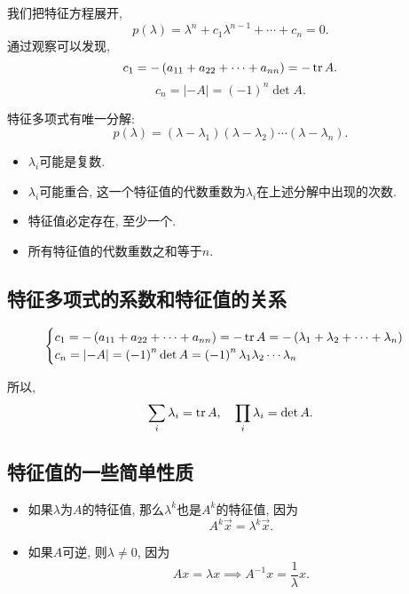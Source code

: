 我们把特征方程展开, 
\begin{equation}
  p\left( \lambda \right) = \lambda ^{n} + c_1 \lambda ^{n-1} + \cdots + c_n = 0.
\end{equation}
通过观察可以发现,
\begin{equation}
    c_1 = - \left( a_{11} + a_{22} + \cdots + a_{nn} \right) = - \tr A.
\end{equation}
\begin{equation}
    c_n = \left| -A \right| = \left( -1 \right) ^{n} \det A.
\end{equation}

特征多项式有唯一分解:
\begin{equation}
    p\left( \lambda \right) = \left( \lambda - \lambda_1 \right) \left( \lambda - \lambda_2 \right) \cdots \left( \lambda - \lambda_n \right).
\end{equation}
\begin{itemize}
    \item $\lambda_i$可能是复数.
    \item $\lambda_i$可能重合, 这一个特征值的代数重数为$\lambda_i$在上述分解中出现的次数.
    \item 特征值必定存在, 至少一个.
    \item 所有特征值的代数重数之和等于$n$.
\end{itemize}

\subsection{特征多项式的系数和特征值的关系}
\begin{equation}
    \begin{cases}
        c_1 = - \left( a_{11} + a_{22} + \cdots + a_{nn} \right) = - \tr A = - \left( \lambda_1 + \lambda_2 + \cdots + \lambda_n \right)
        \\
        c_n = \left| -A \right| = \left( -1 \right) ^{n} \det A = \left( -1 \right) ^{n} \lambda_1 \lambda_2 \cdots \lambda_n
    \end{cases}
\end{equation}

所以, 
\begin{equation}
  \sum_{i} \lambda_i = \tr A, \quad \prod_{i} \lambda_i = \det A.
\end{equation}

\subsection{特征值的一些简单性质}
\begin{itemize}
    \item 如果$\lambda$为$A$的特征值, 那么$\lambda^k$也是$A^k$的特征值, 因为
    \begin{equation}
        A^k \vec{x} = \lambda^k \vec{x}.
    \end{equation}

    \item 如果$A$可逆, 则$\lambda \neq 0$, 因为
    \begin{equation}
        A x = \lambda x \implies A^{-1} x = \frac{1}{\lambda} x.
    \end{equation}
\end{itemize}

